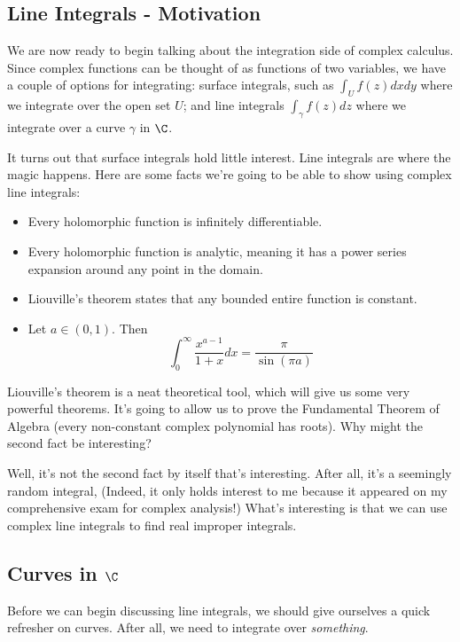 \subsection{Line Integrals - Motivation}

We are now ready to begin talking about the integration side of complex calculus. Since complex functions can be thought of as functions of two variables, we have a couple of options for integrating: surface integrals, such as $\int_{U} f(z)dxdy$ where we integrate over the open set $U$; and line integrals $\int_{\gamma} f(z)dz$ where we integrate over a curve $\gamma$ in $\C$.

It turns out that surface integrals hold little interest. Line integrals are where the magic happens. Here are some facts we're going to be able to show using complex line integrals:

\begin{itemize}
\item Every holomorphic function is infinitely differentiable.
\item Every holomorphic function is analytic, meaning it has a power series expansion around any point in the domain.
\item Liouville's theorem states that any bounded entire function is constant.
\item Let $a\in (0,1)$. Then 
$$\int_0^\infty \frac{x^{a - 1}}{1 + x}dx = \frac{\pi}{\sin(\pi a)}$$
\end{itemize}

Liouville's theorem is a neat theoretical tool, which will give us some very powerful theorems. It's going to allow us to prove the Fundamental Theorem of Algebra (every non-constant complex polynomial has roots). Why might the second fact be interesting?

Well, it's not the second fact by itself that's interesting. After all, it's a seemingly random integral, (Indeed, it only holds interest to me because it appeared on my comprehensive exam for complex analysis!) What's interesting is that we can use complex line integrals to find real improper integrals.

\subsection{Curves in $\C$}

Before we can begin discussing line integrals, we should give ourselves a quick refresher on curves. After all, we need to integrate over {\it something}.

